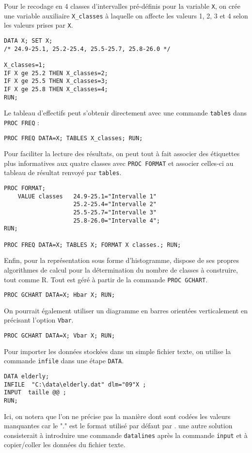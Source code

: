 Pour le recodage en 4 classes d'intervalles pré-définis pour la variable
\texttt{X}, on crée une variable auxiliaire \verb|X_classes| à laquelle on
affecte les valeurs 1, 2, 3 et 4 selon les valeurs prises par \texttt{X}.
\begin{verbatim}
DATA X; SET X;
/* 24.9-25.1, 25.2-25.4, 25.5-25.7, 25.8-26.0 */

X_classes=1;
IF X ge 25.2 THEN X_classes=2;
IF X ge 25.5 THEN X_classes=3;
IF X ge 25.8 THEN X_classes=4;
RUN;
\end{verbatim}
Le tableau d'effectifs peut s'obtenir directement avec une commande
\texttt{tables} dans \texttt{PROC FREQ} :
\begin{verbatim}
PROC FREQ DATA=X; TABLES X_classes; RUN;
\end{verbatim}
Pour faciliter la lecture des résultats, on peut tout à fait associer des
étiquettes plus informatives aux quatre classes avec \texttt{PROC FORMAT}
et associer celles-ci au tableau de résultat renvoyé par \texttt{tables}.
\begin{verbatim}
PROC FORMAT;
    VALUE classes   24.9-25.1="Intervalle 1"
                    25.2-25.4="Intervalle 2"
                    25.5-25.7="Intervalle 3"
                    25.8-26.0="Intervalle 4";
RUN;

PROC FREQ DATA=X; TABLES X; FORMAT X classes.; RUN;
\end{verbatim}

Enfin, pour la représentation sous forme d'histogramme, \SAS dispose de ses
propres algorithmes de calcul pour la détermination du nombre de classes à
construire, tout comme R. Tout est géré à partir de la commande
\texttt{PROC GCHART}.
\begin{verbatim}
PROC GCHART DATA=X; Hbar X; RUN;  
\end{verbatim}

On pourrait également utiliser un diagramme en barres orientées
verticalement en précisant l'option \texttt{Vbar}.
\begin{verbatim}
PROC GCHART DATA=X; Vbar X; RUN;
\end{verbatim}
%
%
%
\soln{\ref{exo:8.5}}
Pour importer les données stockées dans un simple fichier texte, on utilise
la commande \verb|infile| dans une étape \texttt{DATA}.
\begin{verbatim}
DATA elderly;
INFILE  "C:\data\elderly.dat" dlm="09"X ;
INPUT  taille @@ ;
RUN;
\end{verbatim}
Ici, on notera que l'on ne précise pas la manière dont sont codées les
valeurs manquantes car le "." est le format utilisé par défaut par \SAS. une
autre solution consisterait à introduire une commande \texttt{datalines}
après la commande \texttt{input} et à copier/coller les données du fichier
texte. 

